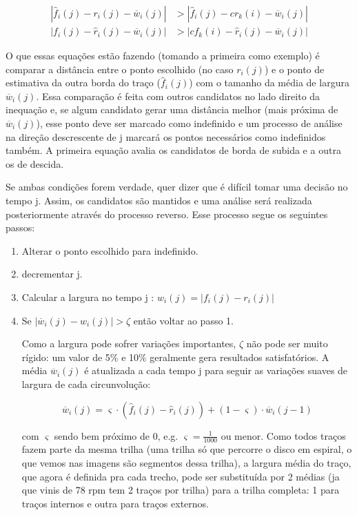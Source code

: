 \documentclass[
	12pt,				%
	openright,			%
	twoside,			%
	a4paper,			%
	english,			%
	french,				%
	spanish,			%
	brazil				%
	]{abntex2}
\newcommand{\estimr}{\hat{r}_i(j)}
\newcommand{\estimf}{\hat{f}_i(j)}
\newcommand{\func}[3]{#1_{#2}(#3)}
\newcommand{\funcbar}[3]{\overline{#1}_{#2}(#3)}
\begin{document}
\begin{align}
| \estimf - \func{r}{i}{j} - \funcbar{w}{i}{j}| &>
| \estimf - \func{cr}{k}{i} - \funcbar{w}{i}{j}|
\\
| \func{f}{i}{j} - \estimr - \funcbar{w}{i}{j}| &>
| \func{cf}{k}{i} - \estimr - \funcbar{w}{i}{j}|
\end{align}

O que essas equações estão fazendo (tomando a primeira como exemplo) é comparar a distância entre o ponto escolhido (no caso $\func{r}{i}{j}$) e o ponto de estimativa da outra borda do traço ($\estimf$) com o tamanho da média de largura $\funcbar{w}{i}{j}$. Essa comparação é feita com outros candidatos no lado direito da inequação e, se algum candidato gerar uma distância melhor (mais próxima de $\funcbar{w}{i}{j}$), esse ponto deve ser marcado como indefinido e um processo de análise na direção descrescente de j marcará os pontos necessários como indefinidos também. A primeira equação avalia os candidatos de borda de subida e a outra os de descida.

Se ambas condições forem verdade, quer dizer que é difícil tomar uma decisão no tempo j. Assim, os candidatos são mantidos e uma análise será realizada posteriormente através do processo reverso.
Esse processo segue os seguintes passos:
\begin{enumerate}
\item Alterar o ponto escolhido para indefinido.
\item decrementar j.
\item Calcular a largura no tempo j : $\func{w}{i}{j} = |\func{f}{i}{j} - \func{r}{i}{j}|$
\item Se $|\funcbar{w}{i}{j} - \func{w}{i}{j} | > \zeta$ então voltar ao passo 1.

Como a largura pode sofrer variações importantes, $\zeta$ não pode ser muito rígido: um valor de 5\% e 10\% geralmente gera resultados satisfatórios.
A média $\funcbar{w}{i}{j}$ é atualizada a cada tempo j para seguir as variações suaves de largura de cada circunvolução:

\begin{equation}
\funcbar{w}{i}{j} = \varsigma\cdot( \estimf - \estimr ) + (1 - \varsigma) \cdot \funcbar{w}{i}{j-1}
\end{equation}

com $\varsigma$ sendo bem próximo de 0, e.g. $\varsigma = \frac{1}{1000}$ ou menor. Como todos traços fazem parte da mesma trilha (uma trilha só que percorre o disco em espiral, o que vemos nas imagens são segmentos dessa trilha), a largura média do traço, que agora é definida pra cada trecho, pode ser substituída por 2 médias (ja que vinis de 78 rpm tem 2 traços por trilha) para a trilha completa: 1 para traços internos e outra para traços externos.

\end{enumerate}
\end{document}
